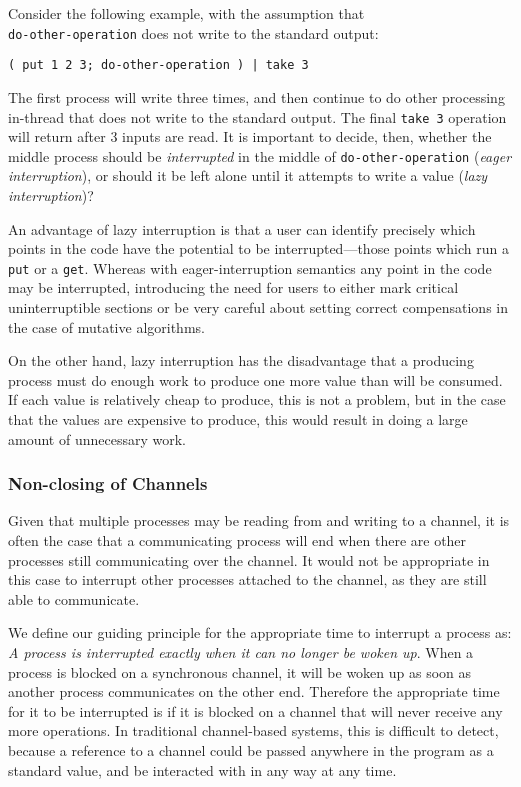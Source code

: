 \documentclass[english,preprint,JIP,uplatex]{ipsj}
\begin{document}
Consider the following example, with the assumption that \\ \verb/do-other-operation/ does not write to the standard output:
\begin{lstlisting}
( put 1 2 3; do-other-operation ) | take 3
\end{lstlisting}

\noindent
The first process will write three times, and then continue to do other processing in-thread that does not write to the standard output.
The final \verb/take 3/ operation will return after 3 inputs are read.
It is important to decide, then, whether the middle process should be \emph{interrupted} in the middle of \verb/do-other-operation/ (\emph{eager interruption}), or should it be left alone until it attempts to write a value (\emph{lazy interruption})?

An advantage of lazy interruption is that a user can identify precisely which points in the code have the potential to be interrupted---those points which run a \verb/put/ or a \verb/get/. Whereas with eager-interruption semantics any point in the code may be interrupted, introducing the need for users to either mark critical uninterruptible sections or be very careful about setting correct compensations in the case of mutative algorithms.

On the other hand, lazy interruption has the disadvantage that a producing process must do enough work to produce one more value than will be consumed. If each value is relatively cheap to produce, this is not a problem, but in the case that the values are expensive to produce, this would result in doing a large amount of unnecessary work.

\subsubsection{Non-closing of Channels}\noindent
Given that multiple processes may be reading from and writing to a channel, it is often the case that a communicating process will end when there are other processes still communicating over the channel. It would not be appropriate in this case to interrupt other processes attached to the channel, as they are still able to communicate.

We define our guiding principle for the appropriate time to interrupt a process as: \emph{A process is interrupted exactly when it can no longer be woken up}.
When a process is blocked on a synchronous channel, it will be woken up as soon as another process communicates on the other end.
Therefore the appropriate time for it to be interrupted is if it is blocked on a channel that will never receive any more operations.
In traditional channel-based systems, this is difficult to detect, because a reference to a channel could be passed anywhere in the program as a standard value, and be interacted with in any way at any time.
\end{document}
